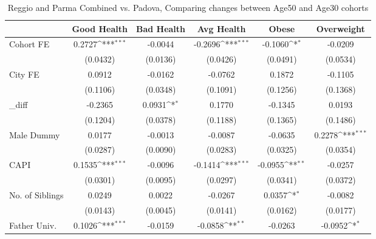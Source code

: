 \begin{table}[htbp]\centering
\def\sym#1{\ifmmode^{#1}\else\(^{#1}\)\fi}
\caption{Reggio and Parma Combined vs. Padova, Comparing changes between Age50 and Age30 cohorts}
\begin{tabular}{l*{5}{c}}
\toprule
            &\multicolumn{1}{c}{Good Health}&\multicolumn{1}{c}{Bad Health}&\multicolumn{1}{c}{Avg Health}&\multicolumn{1}{c}{Obese}&\multicolumn{1}{c}{Overweight}\\
\midrule
Cohort FE   &      0.2727\sym{***}&     -0.0044         &     -0.2696\sym{***}&     -0.1060\sym{*}  &     -0.0209         \\
            &    (0.0432)         &    (0.0136)         &    (0.0426)         &    (0.0491)         &    (0.0534)         \\
\addlinespace
City FE     &      0.0912         &     -0.0162         &     -0.0762         &      0.1872         &     -0.1105         \\
            &    (0.1106)         &    (0.0348)         &    (0.1091)         &    (0.1256)         &    (0.1368)         \\
\addlinespace
\_diff       &     -0.2365         &      0.0931\sym{*}  &      0.1770         &     -0.1345         &      0.0193         \\
            &    (0.1204)         &    (0.0378)         &    (0.1188)         &    (0.1365)         &    (0.1486)         \\
\addlinespace
Male Dummy  &      0.0177         &     -0.0013         &     -0.0087         &     -0.0635         &      0.2278\sym{***}\\
            &    (0.0287)         &    (0.0090)         &    (0.0283)         &    (0.0325)         &    (0.0354)         \\
\addlinespace
CAPI        &      0.1535\sym{***}&     -0.0096         &     -0.1414\sym{***}&     -0.0955\sym{**} &     -0.0257         \\
            &    (0.0301)         &    (0.0095)         &    (0.0297)         &    (0.0341)         &    (0.0372)         \\
\addlinespace
No. of Siblings&      0.0249         &      0.0022         &     -0.0267         &      0.0357\sym{*}  &     -0.0082         \\
            &    (0.0143)         &    (0.0045)         &    (0.0141)         &    (0.0162)         &    (0.0177)         \\
\addlinespace
Father Univ.&      0.1026\sym{***}&     -0.0159         &     -0.0858\sym{**} &     -0.0263         &     -0.0952\sym{*}  \\

\end{tabular}
\end{table}

